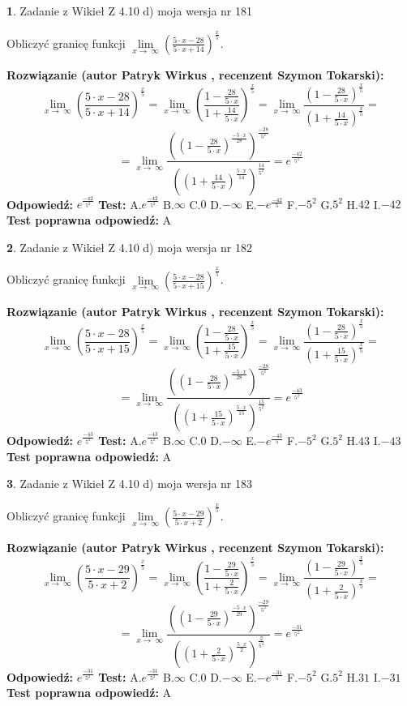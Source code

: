 \documentclass[12pt, a4paper]{article}
\theoremstyle{definition} %
\newtheorem{zad}{}
\newcommand{\zadStart}[1]{\begin{zad}#1\newline}
\newcommand{\zadStop}{\end{zad}}
\newcommand{\rozwStart}[2]{\noindent \textbf{Rozwiązanie (autor #1 , recenzent #2): }\newline}
\newcommand{\rozwStop}{\newline}
\newcommand{\odpStart}{\noindent \textbf{Odpowiedź:}\newline}
\newcommand{\odpStop}{\newline}
\newcommand{\testStart}{\noindent \textbf{Test:}\newline}
\newcommand{\testStop}{\newline}
\newcommand{\kluczStart}{\noindent \textbf{Test poprawna odpowiedź:}\newline}
\newcommand{\kluczStop}{\newline}
\begin{document}
\zadStart{Zadanie z Wikieł Z 4.10 d) moja wersja nr 181}


Obliczyć granicę funkcji  $\lim\limits_{x\to\ \infty}(\frac{5\cdot x-28}{5\cdot x+14})^{\frac{x}{5}}$.
\zadStop
\rozwStart{Patryk Wirkus}{Szymon Tokarski}
$$\lim\limits_{x\to\ \infty}(\frac{5\cdot x-28}{5\cdot x+14})^{\frac{x}{5}} = \lim\limits_{x\to\ \infty}(\frac{1-\frac{28}{5\cdot x}}{1+\frac{14}{5\cdot x}})^{\frac{x}{5}}=\lim\limits_{x\to\ \infty}\frac{(1-\frac{28}{5\cdot x})^{\frac{x}{5}}}{(1+\frac{14}{5\cdot x})^{\frac{x}{5}}}=$$
$$=\lim\limits_{x\to\ \infty}\frac{((1-\frac{28}{5\cdot x})^{\frac{-5\cdot x}{28}})^{\frac{-28}{5^{2}}}}{((1+\frac{14}{5\cdot x})^{\frac{5\cdot x}{14}})^{\frac{14}{5^{2}}}}=e^{\frac{-42}{5^{2}}}$$
\rozwStop
\odpStart
$e^{\frac{-42}{5^{2}}}$
\odpStop
\testStart
A.$e^{\frac{-42}{5^{2}}}$ B.$\infty$ C.$0$ D.$-\infty$ E.$-e^{\frac{-42}{5}}$
F.$-5^{2}$ G.$5^{2}$
H.$42$
I.$-42$
\testStop
\kluczStart
A
\kluczStop



\zadStart{Zadanie z Wikieł Z 4.10 d) moja wersja nr 182}


Obliczyć granicę funkcji  $\lim\limits_{x\to\ \infty}(\frac{5\cdot x-28}{5\cdot x+15})^{\frac{x}{5}}$.
\zadStop
\rozwStart{Patryk Wirkus}{Szymon Tokarski}
$$\lim\limits_{x\to\ \infty}(\frac{5\cdot x-28}{5\cdot x+15})^{\frac{x}{5}} = \lim\limits_{x\to\ \infty}(\frac{1-\frac{28}{5\cdot x}}{1+\frac{15}{5\cdot x}})^{\frac{x}{5}}=\lim\limits_{x\to\ \infty}\frac{(1-\frac{28}{5\cdot x})^{\frac{x}{5}}}{(1+\frac{15}{5\cdot x})^{\frac{x}{5}}}=$$
$$=\lim\limits_{x\to\ \infty}\frac{((1-\frac{28}{5\cdot x})^{\frac{-5\cdot x}{28}})^{\frac{-28}{5^{2}}}}{((1+\frac{15}{5\cdot x})^{\frac{5\cdot x}{15}})^{\frac{15}{5^{2}}}}=e^{\frac{-43}{5^{2}}}$$
\rozwStop
\odpStart
$e^{\frac{-43}{5^{2}}}$
\odpStop
\testStart
A.$e^{\frac{-43}{5^{2}}}$ B.$\infty$ C.$0$ D.$-\infty$ E.$-e^{\frac{-43}{5}}$
F.$-5^{2}$ G.$5^{2}$
H.$43$
I.$-43$
\testStop
\kluczStart
A
\kluczStop



\zadStart{Zadanie z Wikieł Z 4.10 d) moja wersja nr 183}


Obliczyć granicę funkcji  $\lim\limits_{x\to\ \infty}(\frac{5\cdot x-29}{5\cdot x+2})^{\frac{x}{5}}$.
\zadStop
\rozwStart{Patryk Wirkus}{Szymon Tokarski}
$$\lim\limits_{x\to\ \infty}(\frac{5\cdot x-29}{5\cdot x+2})^{\frac{x}{5}} = \lim\limits_{x\to\ \infty}(\frac{1-\frac{29}{5\cdot x}}{1+\frac{2}{5\cdot x}})^{\frac{x}{5}}=\lim\limits_{x\to\ \infty}\frac{(1-\frac{29}{5\cdot x})^{\frac{x}{5}}}{(1+\frac{2}{5\cdot x})^{\frac{x}{5}}}=$$
$$=\lim\limits_{x\to\ \infty}\frac{((1-\frac{29}{5\cdot x})^{\frac{-5\cdot x}{29}})^{\frac{-29}{5^{2}}}}{((1+\frac{2}{5\cdot x})^{\frac{5\cdot x}{2}})^{\frac{2}{5^{2}}}}=e^{\frac{-31}{5^{2}}}$$
\rozwStop
\odpStart
$e^{\frac{-31}{5^{2}}}$
\odpStop
\testStart
A.$e^{\frac{-31}{5^{2}}}$ B.$\infty$ C.$0$ D.$-\infty$ E.$-e^{\frac{-31}{5}}$
F.$-5^{2}$ G.$5^{2}$
H.$31$
I.$-31$
\testStop
\kluczStart
A
\kluczStop
\end{document}
